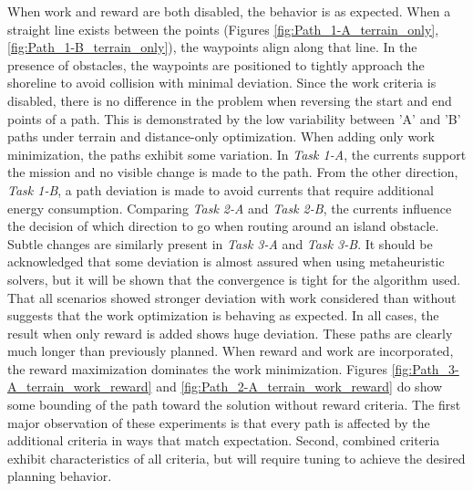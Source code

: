\documentclass{tamuccthesis}
\begin{document}
When work and reward are both disabled, the behavior is as expected. When a straight line exists between the points (Figures \ref{fig:Path_1-A_terrain_only}, \ref{fig:Path_1-B_terrain_only}), the waypoints align along that line. In the presence of obstacles, the waypoints are positioned to tightly approach the shoreline to avoid collision with minimal deviation. Since the work criteria is disabled, there is no difference in the problem when reversing the start and end points of a path. This is demonstrated by the low variability between 'A' and 'B' paths under terrain and distance-only optimization. When adding only work minimization, the paths exhibit some variation. In \textit{Task 1-A}, the currents support the mission and no visible change is made to the path. From the other direction, \textit{Task 1-B}, a path deviation is made to avoid currents that require additional energy consumption. Comparing \textit{Task 2-A} and \textit{Task 2-B}, the currents influence the decision of which direction to go when routing around an island obstacle. Subtle changes are similarly present in \textit{Task 3-A} and \textit{Task 3-B}. It should be acknowledged that some deviation is almost assured when using metaheuristic solvers, but it will be shown that the convergence is tight for the algorithm used. That all scenarios showed stronger deviation with work considered than without suggests that the work optimization is behaving as expected. In all cases, the result when only reward is added shows huge deviation. These paths are clearly much longer than previously planned. When reward and work are incorporated, the reward maximization dominates the work minimization. Figures \ref{fig:Path_3-A_terrain_work_reward} and \ref{fig:Path_2-A_terrain_work_reward} do show some bounding of the path toward the solution without reward criteria. The first major observation of these experiments is that every path is affected by the additional criteria in ways that match expectation. Second, combined criteria exhibit characteristics of all criteria, but will require tuning to achieve the desired planning behavior.
\end{document}
